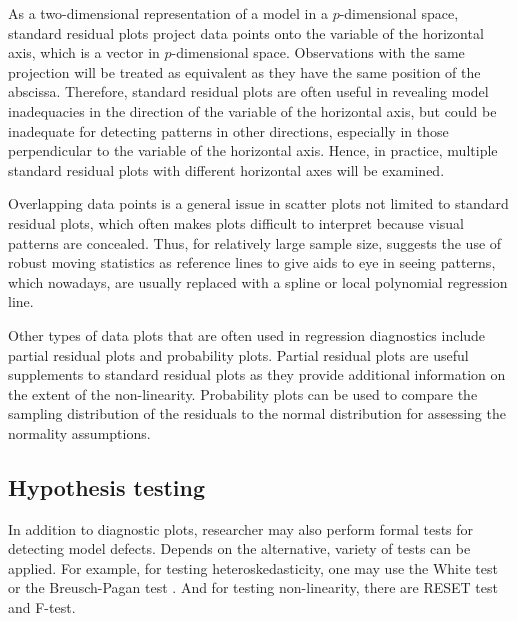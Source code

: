 \documentclass[]{interact}
\theoremstyle{plain}%
\theoremstyle{definition}
\theoremstyle{remark}
\begin{document}
As a two-dimensional representation of a model in a \(p\)-dimensional
space, standard residual plots project data points onto the variable of
the horizontal axis, which is a vector in \(p\)-dimensional space.
Observations with the same projection will be treated as equivalent as
they have the same position of the abscissa. Therefore, standard
residual plots are often useful in revealing model inadequacies in the
direction of the variable of the horizontal axis, but could be
inadequate for detecting patterns in other directions, especially in
those perpendicular to the variable of the horizontal axis. Hence, in
practice, multiple standard residual plots with different horizontal
axes will be examined.

Overlapping data points is a general issue in scatter plots not limited
to standard residual plots, which often makes plots difficult to
interpret because visual patterns are concealed. Thus, for relatively
large sample size, \citet{cleveland1975graphical} suggests the use of
robust moving statistics as reference lines to give aids to eye in
seeing patterns, which nowadays, are usually replaced with a spline or
local polynomial regression line.

Other types of data plots that are often used in regression diagnostics
include partial residual plots and probability plots. Partial residual
plots are useful supplements to standard residual plots as they provide
additional information on the extent of the non-linearity. Probability
plots can be used to compare the sampling distribution of the residuals
to the normal distribution for assessing the normality assumptions.

\hypertarget{hypothesis-testing}{%
\subsection{Hypothesis testing}\label{hypothesis-testing}}

In addition to diagnostic plots, researcher may also perform formal
tests for detecting model defects. Depends on the alternative, variety
of tests can be applied. For example, for testing heteroskedasticity,
one may use the White test
\citep{white_heteroskedasticity-consistent_1980} or the Breusch-Pagan
test \citep{breusch_simple_1979}. And for testing non-linearity, there
are RESET test \citep{ramsey_tests_1969} and F-test.
\end{document}
